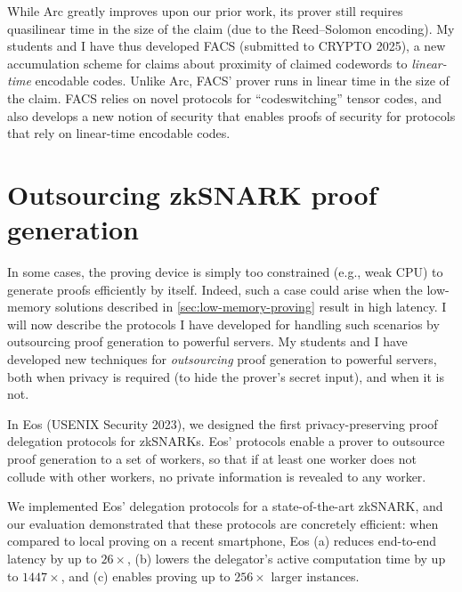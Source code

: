 \documentclass[11pt,letterpaper]{article}
\theoremstyle{definition} %
\theoremstyle{remark} %
\begin{document}
While Arc greatly improves upon our prior work, its prover still requires quasilinear time in the size of the claim (due to the Reed--Solomon encoding).
My students and I have thus developed FACS \cite{BawejaMMS25} (submitted to CRYPTO 2025), a new accumulation scheme for claims about proximity of claimed codewords to \emph{linear-time} encodable codes.
Unlike Arc, FACS' prover runs in linear time in the size of the claim.
FACS relies on novel protocols for ``codeswitching'' tensor codes, and also develops a new notion of security that enables proofs of security for protocols that rely on linear-time encodable codes.


\section{Outsourcing zkSNARK proof generation}
\label{sec:outsourcing}

In some cases, the proving device is simply too constrained (e.g., weak CPU) to generate proofs efficiently by itself.
Indeed, such a case could arise when the low-memory solutions described in \cref{sec:low-memory-proving} result in high latency.
I will now describe the protocols I have developed for handling such scenarios by outsourcing proof generation to powerful servers.
My students and I have developed new techniques for \emph{outsourcing} proof generation to powerful servers, both when privacy is required (to hide the prover's secret input), and when it is not.
 
In Eos \cite{ChiesaLMZ23} (USENIX Security 2023), we designed the first privacy-preserving proof delegation protocols for zkSNARKs. 
Eos' protocols enable a prover to outsource proof generation to a set of workers, so that if at least one worker does not collude with other workers, no private information is revealed to any worker. 

We implemented Eos' delegation protocols for a state-of-the-art zkSNARK, and 
our evaluation demonstrated that these protocols are concretely efficient: when compared to local proving on a recent smartphone, Eos (a) reduces end-to-end latency by up to $26\times$, (b) lowers the delegator's active computation time by up to $1447\times$, and (c) enables proving up to $256\times$ larger instances.
\end{document}
